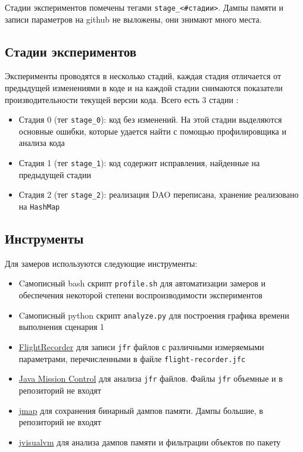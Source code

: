 \documentclass{article}
\begin{document}
		Стадии экспериментов помечены тегами \texttt{stage\_<\#стадии>}. Дампы памяти и записи параметров на github не выложены, они знимают много места.


	\subsection*{Стадии экспериментов}
		Эксперименты проводятся в несколько стадий, каждая стадия отличается от предыдущей изменениями в коде и на каждой стадии снимаются показатели производительности текущей версии кода. Всего есть 3 стадии :
		\begin{itemize}
			\item  Стадия 0 (тег \texttt{stage\_0}): код без изменений. На этой стадии выделяются основные ошибки, которые удается найти с помощью профилировщика и анализа кода
			\item Стадия 1 (тег \texttt{stage\_1}): код содержит исправления, найденные на предыдущей стадии
			\item Стадия 2 (тег \texttt{stage\_2}): реализация DAO переписана, хранение реализовано на \texttt{HashMap}
		\end{itemize}

	\subsection*{Инструменты}
		Для замеров используются следующие инструменты:
		\begin{itemize}
			\item Cамописный bash скрипт \texttt{profile.sh} для автоматизации замеров и обеспечения некоторой степени воспроизводимости экспериментов
			\item Cамописный python скрипт \texttt{analyze.py} для построения графика времени выполнения сценария 1
			\item \href{https://docs.oracle.com/javacomponents/jmc-5-5/jfr-runtime-guide/about.html}{FlightRecorder} для записи \texttt{jfr} файлов с различными измеряемыми параметрами, перечисленными в файле \texttt{flight-recorder.jfc}
			\item \href{https://www.oracle.com/technetwork/java/javaseproducts/mission-control/index.html}{Java Mission Control} для анализа \texttt{jfr} файлов. Файлы \texttt{jfr} объемные и в репозиторий не входят
			\item \href{https://docs.oracle.com/javase/8/docs/technotes/tools/unix/jmap.html}{jmap} для сохранения бинарный дампов памяти. Дампы большие, в репозиторий не входят
			\item \href{https://docs.oracle.com/javase/8/docs/technotes/guides/visualvm/index.html}{jvisualvm} для анализа дампов памяти и фильтрации объектов по пакету
		\end{itemize}
	
\end{document}
